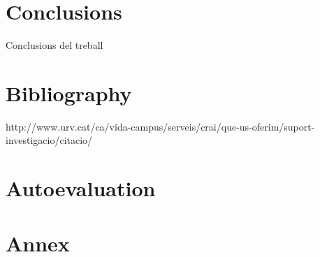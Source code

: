 \documentclass[11pt]{article}
\begin{document}
\section{Conclusions}
Conclusions del treball

\section{Bibliography}
http://www.urv.cat/ca/vida-campus/serveis/crai/que-us-oferim/suport-investigacio/citacio/

\section{Autoevaluation}

\section{Annex}
\end{document}
